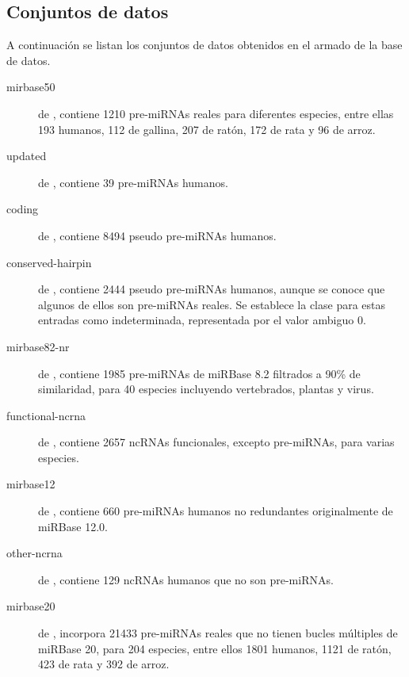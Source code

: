 \documentclass[12pt,bibliography=oldstyle,DIV=12,parskip=half-,titlepage]{scrartcl}
\begin{document}
\subsection{Conjuntos de datos}
A continuación se listan los conjuntos de datos obtenidos en el armado
de la base de datos.
\begin{description}
\item[mirbase50] de \cite{xue}, contiene 1210 pre-miRNAs reales para
  diferentes especies, entre ellas 193 humanos, 112 de gallina, 207 de
  ratón, 172 de rata y 96 de arroz.
\item[updated] de \cite{xue}, contiene 39 pre-miRNAs humanos.
\item[coding] de \cite{xue}, contiene 8494 pseudo pre-miRNAs humanos.
\item[conserved-hairpin] de \cite{xue}, contiene 2444 pseudo
  pre-miRNAs humanos, aunque se conoce que algunos de ellos son
  pre-miRNAs reales. Se establece la clase para estas entradas como
  indeterminada, representada por el valor ambiguo 0.
\item[mirbase82-nr] de \cite{ng}, contiene 1985 pre-miRNAs de miRBase
  8.2 filtrados a 90\% de similaridad, para 40 especies incluyendo
  vertebrados, plantas y virus.
\item[functional-ncrna] de \cite{ng}, contiene 2657 ncRNAs
  funcionales, excepto pre-miRNAs, para varias
  especies.\item[mirbase12] de \cite{batuwita}, contiene 660
  pre-miRNAs humanos no redundantes originalmente de miRBase 12.0.
\item[other-ncrna] de \cite{batuwita}, contiene 129 ncRNAs humanos que
  no son pre-miRNAs.
\item[mirbase20] de \cite{mirbase2}, incorpora 21433 pre-miRNAs reales
  que no tienen bucles múltiples de miRBase 20, para 204 especies,
  entre ellos 1801 humanos, 1121 de ratón, 423 de rata y 392 de arroz.
\end{description}
%
%
\renewcommand{\bibfont}{\normalfont\footnotesize}
\printbibliography
%
\end{document}
